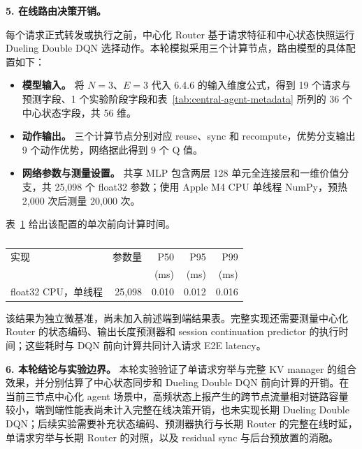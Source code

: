 \medskip
\noindent\textbf{5. 在线路由决策开销。}
\begin{changehighlight}
每个请求正式转发或执行之前，中心化 Router 基于请求特征和中心状态快照运行 Dueling Double DQN 选择动作。本轮模拟采用三个计算节点，路由模型的具体配置如下：
\begin{itemize}
    \item \textbf{模型输入。} 将 \(N=3\)、\(E=3\) 代入 6.4.6 的输入维度公式，得到 19 个请求与预测字段、1 个实验阶段字段和表~\ref{tab:central-agent-metadata} 所列的 36 个中心状态字段，共 56 维。
    \item \textbf{动作输出。} 三个计算节点分别对应 reuse、sync 和 recompute，优势分支输出 9 个动作优势，网络据此得到 9 个 Q 值。
    \item \textbf{网络参数与测量设置。} 共享 MLP 包含两层 128 单元全连接层和一维价值分支，共 25,098 个 float32 参数；使用 Apple M4 CPU 单线程 NumPy，预热 2,000 次后测量 20,000 次。
\end{itemize}
表~\ref{tab:dqn-forward-overhead} 给出该配置的单次前向计算时间。
\end{changehighlight}

\begin{table}[H]
\centering
\small
\caption{}
\label{tab:dqn-forward-overhead}
\begin{tabular}{@{}lrrrr@{}}
\toprule
实现 & 参数量 & P50 & P95 & P99 \\
 & & (ms) & (ms) & (ms) \\
\midrule
float32 CPU，单线程
& 25,098 & 0.010 & 0.012 & 0.016 \\
\bottomrule
\end{tabular}
\end{table}

该结果为独立微基准，尚未加入前述端到端结果表。完整实现还需要测量中心化 Router 的状态编码、输出长度预测器和 session continuation predictor 的执行时间；这些耗时与 DQN 前向计算共同计入请求 E2E latency。

\medskip
\noindent\textbf{6. 本轮结论与实验边界。}
本轮实验验证了单请求穷举与完整 KV manager 的组合效果，并分别估算了中心状态同步和 Dueling Double DQN 前向计算的开销。在当前三节点中心化 agent 场景中，高频状态上报产生的跨节点流量相对链路容量较小，端到端性能表尚未计入完整在线决策开销，也未实现长期 Dueling Double DQN；后续实验需要补充状态编码、预测器执行与长期 Router 的完整在线时延，单请求穷举与长期 Router 的对照，以及 residual sync 与后台预放置的消融。

